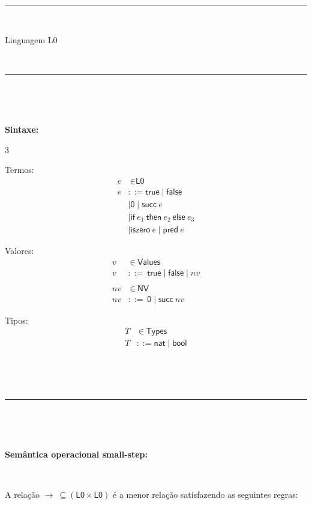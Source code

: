 \documentclass[10pt,a4paper]{article}
\title{}
\author{}
\date{}
\begin{document}
\small 

\hrule 

\ 

\begin{center}
\Large Linguagem L0
\end{center}

\ 

\hrule 

\ 

\ 

\noindent \textbf{Sintaxe:}


\begin{multicols}3



\noindent Termos:
\begin{align*}
e & \ \in \textsf{L0} \\ 
e & ::= \textsf{true} \mid \textsf{false} \\ & \mid \textsf{0} \mid \textsf{succ}\ e     \\ \ &  \mid \textsf{if}\ e_1\ \textsf{then}\ e_2\ \textsf{else}\ e_3 \\ & \mid \textsf{iszero}\ e \mid \textsf{pred}\ e 
\end{align*}

\noindent Valores:
\begin{align*}
v & \ \in \ \textsf{Values} \\
v & ::= \ \textsf{true}  \mid  \textsf{false}  \mid nv \\ \\
nv & \ \in \ \textsf{NV} \\
nv & ::= \ \textsf{0} \mid  \textsf{succ}\ nv
\end{align*}

\noindent Tipos:
\begin{align*}
T & \ \in \ \textsf{Types} \\
T & ::= \textsf{nat} \mid \textsf{bool}
\end{align*}

\end{multicols}

\ 

\ 

\hrule

\ 

\ 

\noindent \textbf{Semântica operacional small-step:}

\ 

\noindent A relação $\longrightarrow\  \subseteq (\textsf{L0} \times \textsf{L0})$ é a menor relação satisfazendo as seguintes regras:
\end{document}
